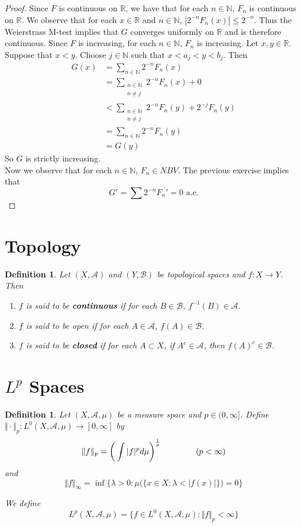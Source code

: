 \documentclass[12pt]{amsart}
\newtheorem{defn}[thm]{Definition}
\newcommand{\lam}{\lambda}
\newcommand{\N}{\mathbb{N}}
\newcommand{\R}{\mathbb{R}}
\newcommand{\MA}{\mathcal{A}}
\newcommand{\MB}{\mathcal{B}}
\newcommand{\n}{\Vert}
\begin{document}
\begin{proof}
Since $F$ is continuous on $\R$, we have that for each $n \in \N$, $F_n$ is continuous on $\R$. We observe that for each $x \in \R$ and $n \in \N$, $|2^{-n}F_n(x)| \leq 2^{-n}$. Thus the Weierstrass M-test implies that $G$ converges uniformly on $\R$ and is therefore continuous. Since $F$ is increasing, for each $n \in \N$, $F_n$ is increasing. Let $x, y \in \R$. Suppose that $x<y$. Choose $j \in \N$ such that $x<a_j<y<b_j$. Then 
\begin{align*}
G(x) 
&= \sum_{n \in \N}2^{-n}F_n(x)\\
&= \sum_{\substack{n \in \N \\ n \neq j}}2^{-n}F_n(x) + 0\\
& < \sum_{\substack{n \in \N \\ n \neq j}}2^{-n}F_n(y) + 2^{-j}F_n(y)\\
&=\sum_{n \in \N}2^{-n}F_n(y)\\
&=G(y)
\end{align*}
So $G$ is strictly increasing.\\
Now we observe that for each $n \in \N$, $F_n \in NBV$. The previous exercise implies that $$G' = \sum 2^{-n}F_n'=0 \text{ a.e.}$$
\end{proof}

\section{Topology}

\begin{defn}
Let $(X,\MA)$ and $(Y,\MB)$ be topological spaces and $f:X \rightarrow Y$. Then 
\begin{enumerate}
\item $f$ is said to be \textbf{continuous} if for each $B \in \MB$, $f^{-1}(B) \in \MA$.
\item $f$ is said to be open if for each $A \in \MA$, $f(A) \in \MB$.
\item $f$ is said to be \textbf{closed} if for each $A \subset X$, if $A^c \in \MA$, then $f(A)^c \in \MB$.
\end{enumerate}
\end{defn}

\section{$L^{p}$ Spaces}

\begin{defn}
Let $(X, \MA, \mu)$ be a measure space and $p \in (0, \infty]$. Define $ \n \cdot \n_p : L^0(X, \MA, \mu) \rightarrow [0, \infty]$ by $$\n f \n_p = \bigg(\int \vert f \vert^p d\mu \bigg)^{\frac{1}{p}} \hspace{1.5cm}( p < \infty)$$ 
and 
$$\n f \n_{\infty} = \inf \bigg \{\lam >0: \mu\big(\{x \in X: \lam < \vert f(x) \vert  \}\big) = 0 \bigg \} $$


We define $$L^p(X, \MA, \mu) =  \{f \in L^0(X, \MA, \mu): \n f \n_p < \infty \}$$
\end{defn}
\end{document}
